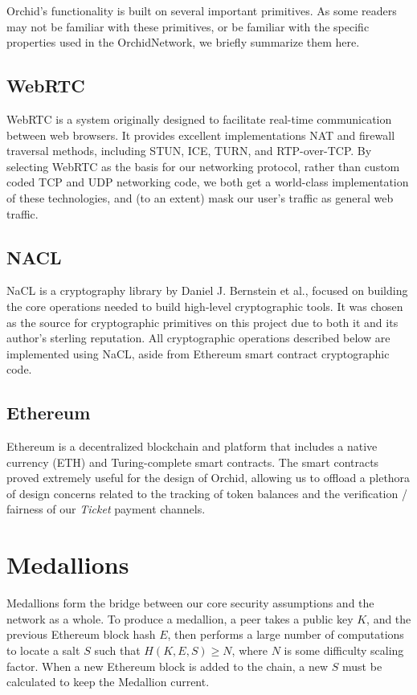 \documentclass{article}
\newcommand{\orchid}{Orchid}
\newcommand{\Orchid}{\orchid}
\begin{document}
\Orchid’s functionality is built on several important primitives. As some readers may not be familiar with these primitives, or be familiar with the specific properties used in the \Orchid Network, we briefly summarize them here.

\subsection{WebRTC}

WebRTC  is a system originally designed to facilitate real-time communication between web browsers. It provides excellent implementations NAT and firewall traversal methods, including STUN, ICE, TURN, and RTP-over-TCP. By selecting WebRTC as the basis for our networking protocol, rather than custom coded TCP and UDP networking code, we both get a world-class implementation of these technologies, and (to an extent) mask our user's traffic as general web traffic.

\subsection{NACL}

NaCL  is a cryptography library by Daniel J. Bernstein et al., focused on building the core operations needed to build high-level cryptographic tools. It was chosen as the source for cryptographic primitives on this project due to both it and its author's sterling reputation. All cryptographic operations described below are implemented using NaCL, aside from Ethereum smart contract cryptographic code.

\subsection{Ethereum}

Ethereum  is a decentralized blockchain and platform that includes a native currency (ETH) and Turing-complete smart contracts. The smart contracts proved extremely useful for the design of \Orchid, allowing us to offload a plethora of design concerns related to the tracking of token balances and the verification / fairness of our \emph{Ticket} payment channels.

\section{Medallions}
\label{medallions}

Medallions form the bridge between our core security assumptions and the network as a whole. To produce a medallion, a peer takes a public key $K$, and the previous Ethereum block hash $E$, then performs a large number of computations to locate a salt $S$ such that $H(K, E, S) \geq N$, where $N$ is some difficulty scaling factor. When a new Ethereum block is added to the chain, a new $S$ must be calculated to keep the Medallion current.
\end{document}
